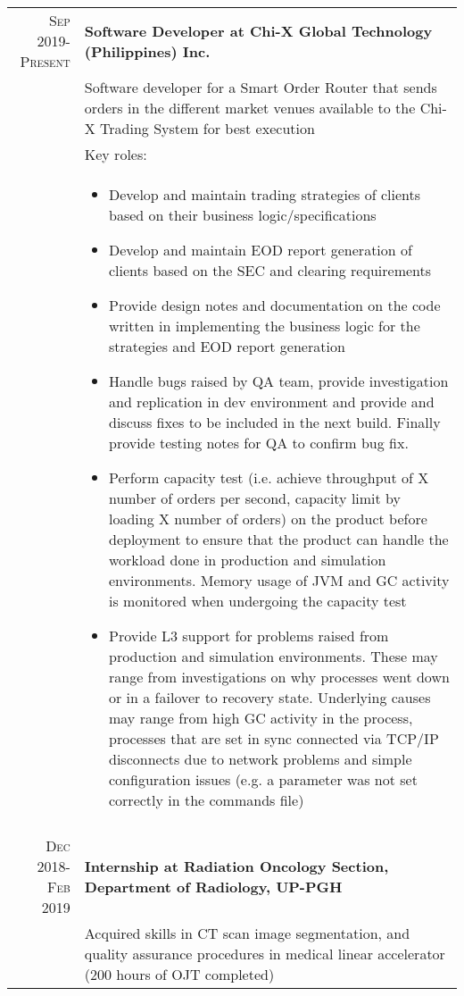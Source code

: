 \documentclass[a4paper,10pt]{article}
\begin{document}
\begin{tabular}{r|p{11cm}}
    \textsc{Sep 2019-Present} & \footnotesize \textbf{Software Developer at Chi-X Global Technology (Philippines) Inc.}\\
    &\footnotesize{Software developer for a Smart Order Router that sends orders in the different market venues available to the Chi-X Trading System for best execution}\\
    
    &\footnotesize{Key roles:}\\
    
    &\begin{flushleft}
    \begin{itemize}
        \item \footnotesize{Develop and maintain trading strategies of clients based on their business logic/specifications}
        \item \footnotesize{Develop and maintain EOD report generation of clients based on the SEC and clearing requirements}
        \item \footnotesize{Provide design notes  and documentation on the code written in implementing the business logic for the strategies and EOD report generation}
        \item \footnotesize{Handle bugs raised by QA team, provide investigation and replication in dev environment and provide and discuss fixes to be included in the next build. Finally provide testing notes for QA to confirm bug fix.}
        \item \footnotesize{Perform capacity test (i.e. achieve throughput of X number of orders per second, capacity limit by loading X number of orders) on the product before deployment to ensure that the product can handle the workload done in production and simulation environments. Memory usage of JVM and GC activity is monitored when undergoing the capacity test}
        \item \footnotesize{Provide L3 support for problems raised from production and simulation environments. These may range from investigations on why processes went down or in a failover to recovery state. Underlying causes may range from high GC activity in the process, processes that are set in sync connected via TCP/IP disconnects due to network problems and simple configuration issues (e.g. a parameter was not set correctly in the commands file) }
    \end{itemize}
    \end{flushleft}

\\\multicolumn{2}{c}{} \\
\textsc{Dec 2018-Feb 2019}  & \footnotesize \textbf{Internship at Radiation Oncology Section, Department of Radiology, UP-PGH}\\
                            &\footnotesize{Acquired skills in CT scan image segmentation, and quality assurance procedures in medical linear accelerator (200 hours of OJT completed)} 

\end{tabular}
\end{document}
